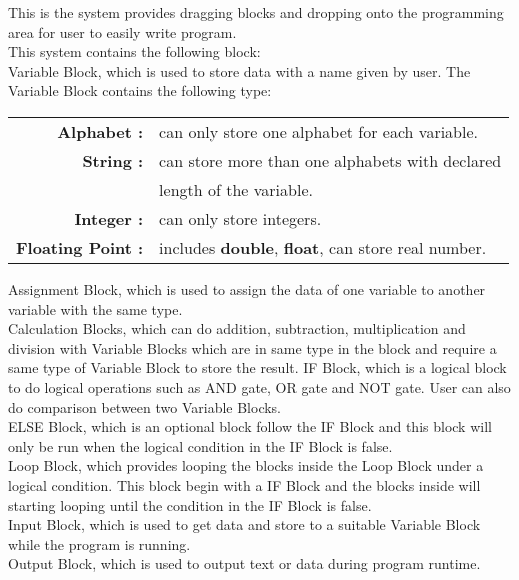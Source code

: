 This is the system provides dragging blocks and dropping onto the programming area for user to easily write program.\\
This system contains the following block:\\
	Variable Block, which is used to store data with a name given by user. The Variable Block contains the following type:

	\begin{tabular}{r l}
		\textbf{Alphabet :} & can only store one alphabet for each variable.\\
		\textbf{String :} & can store more than one alphabets with declared\\
		& length of the variable.\\
		\textbf{Integer :} & can only store integers.\\
		\textbf{Floating Point :} & includes \textbf{double}, \textbf{float}, can store real number.
	\end{tabular}

	Assignment Block, which is used to assign the data of one variable to another variable with the same type.\\
	Calculation Blocks, which can do addition, subtraction, multiplication and division with Variable Blocks which are in same type in the block and require a same type of Variable Block to store the result.
	IF Block, which is a logical block to do logical operations such as AND gate, OR gate and NOT gate. User can also do comparison between two Variable Blocks.\\
	ELSE Block, which is an optional block follow the IF Block and this block will only be run when the logical condition in the IF Block is false.\\
	Loop Block, which provides looping the blocks inside the Loop Block under a logical condition. This block begin with a IF Block and the blocks inside will starting looping until the condition in the IF Block is false.\\
	Input Block, which is used to get data and store to a suitable Variable Block while the program is running.\\
	Output Block, which is used to output text or data during program runtime.\\
